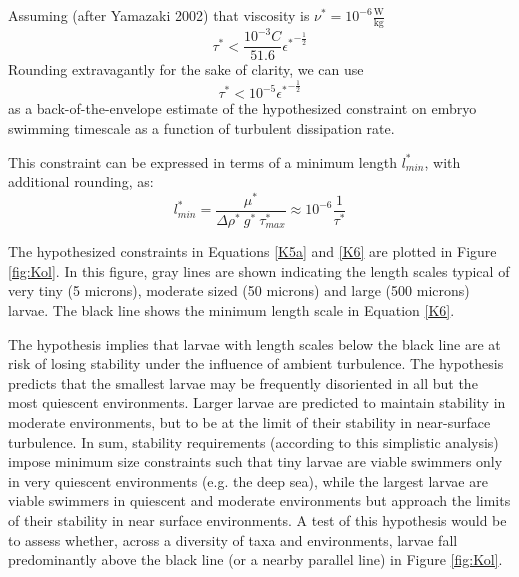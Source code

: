 \documentclass[10pt,a4paper]{article}
\begin{document}
Assuming (after Yamazaki 2002) that viscosity is $\nu^* = 10^{-6} \mathrm{\frac{W}{kg}}$
\begin{equation}\label{K5}
	\tau^* < \frac{10^{-3} C}{51.6} {\epsilon^*}^{-\frac{1}{2}}
\end{equation}
Rounding extravagantly for the sake of clarity, we can use 
\begin{equation}\label{K5a}
	\tau^* < 10^{-5} {\epsilon^*}^{-\frac{1}{2}}
\end{equation}
as a back-of-the-envelope estimate of the hypothesized constraint on embryo swimming timescale as a function of turbulent dissipation rate.

This constraint can be expressed in terms of a minimum length $l_{min}^*$, with additional rounding, as:
\begin{equation}\label{K6}
	l_{min}^* = \frac{\mu^*}{\Delta \rho^* ~ g^* ~ \tau_{max}^*} \approx 10^{-6} \frac{1}{\tau^*}
\end{equation}

The hypothesized constraints in Equations \ref{K5a} and \ref{K6} are plotted in Figure \ref{fig:Kol}.
In this figure, gray lines are shown indicating the length scales typical of very tiny (5 microns), moderate sized (50 microns) and large (500 microns) larvae. 
The black line shows the minimum length scale in Equation \ref{K6}. 

The hypothesis implies that larvae with length scales below the black line are at risk of losing stability under the influence of ambient turbulence.
The hypothesis predicts that the smallest larvae may be frequently disoriented in all but the most quiescent environments.
Larger larvae are predicted to maintain stability in moderate environments, but to be at the limit of their stability in near-surface turbulence.
In sum, stability requirements (according to this simplistic analysis) impose minimum size constraints such that tiny larvae are viable swimmers only in very quiescent environments (e.g. the deep sea), while the largest larvae are viable swimmers in quiescent and moderate environments but approach the limits of their stability in near surface environments. 
A test of this hypothesis would be to assess whether, across a diversity of taxa and environments, larvae fall predominantly above the black line (or a nearby parallel line) in Figure \ref{fig:Kol}.
\end{document}
